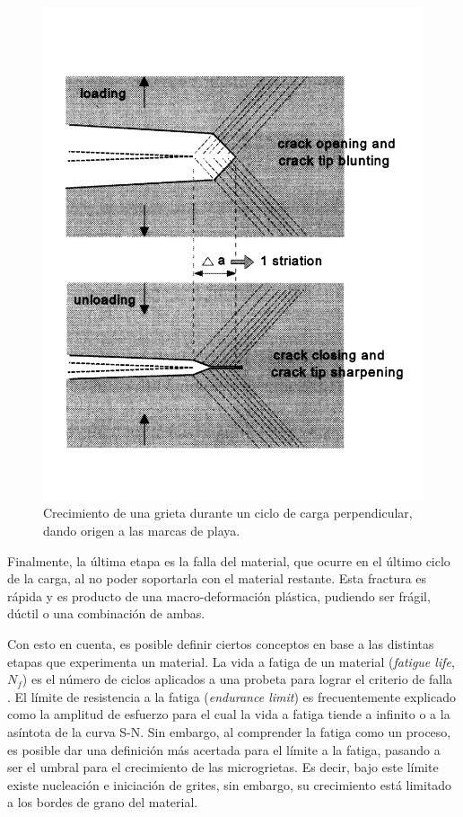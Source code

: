 \begin{figure}[h]
\centering
\includegraphics[width=0.5\linewidth, trim={0cm 2cm 0cm 3cm},clip]{Imagenes/crack_fatigue.pdf}
\caption{Crecimiento de una grieta durante un ciclo de carga perpendicular, dando origen a las marcas de playa. \cite{schijve2001fatigue}}
\label{fig:crack_fat}
\end{figure}

Finalmente, la última etapa es la falla del material, que ocurre en el último ciclo de la carga, al no poder soportarla con el material restante. Esta fractura es rápida y es producto de una macro-deformación plástica, pudiendo ser frágil, dúctil o una combinación de ambas.

Con esto en cuenta, es posible definir ciertos conceptos en base a las distintas etapas que experimenta un material. La vida a fatiga de un material (\textit{fatigue life}, $N_f$) es el número de ciclos aplicados a una probeta para lograr el criterio de falla \cite{ISO23718}. El límite de resistencia a la fatiga (\textit{endurance limit}) es frecuentemente explicado como la amplitud de esfuerzo para el cual la vida a fatiga tiende a infinito o a la asíntota de la curva S-N. Sin embargo, al comprender la fatiga como un proceso, es posible dar una definición más acertada para el límite a la fatiga, pasando a ser el umbral para el crecimiento de las microgrietas. Es decir, bajo este límite existe nucleación e iniciación de grites, sin embargo, su crecimiento está limitado a los bordes de grano del material.

